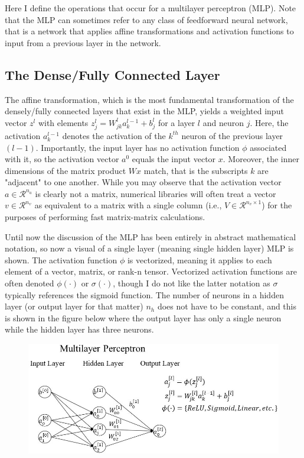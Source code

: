 \documentclass{article}
\begin{document}
\quad Here I define the operations that occur for a multilayer perceptron (MLP).
Note that the MLP can sometimes refer to any class of feedforward
neural network, that is a network that applies affine transformations and
activation functions to input from a previous layer in the network.

\subsection{The Dense/Fully Connected Layer}

The affine transformation, which is the most fundamental transformation
of the densely/fully connected layers that exist in the MLP, yields
a weighted input vector $z^{l}$ with elements
$z_j^{l} = W_{jk}^{l} a_{k}^{l-1} + b_{j}^{l}$ for a layer $l$ and neuron $j$.
Here, the activation $a_k^{l-1}$ denotes the activation of the $k^{th}$ neuron of the
previous layer $(l-1)$. Importantly, the input layer has no activation function $\phi$
associated with it, so the activation vector $a^{0}$ equals the input vector $x$.
Moreover, the inner dimensions of the matrix product
$Wx$ match, that is the subscripts $k$ are "adjacent" to one another. While you may
observe that the activation vector $a \in \mathcal{R}^{n_a}$ is clearly not a matrix,
numerical libraries will often treat a vector $v \in \mathcal{R}^{n_v}$ as equivalent
to a matrix with a single column (i.e., $V \in \mathcal{R}^{n_v \times 1}$) for
the purposes of performing fast matrix-matrix calculations.

Until now the discussion of the MLP has been entirely in abstract mathematical
notation, so now a visual of a single layer (meaning single hidden layer)
MLP is shown. The activation function $\phi$ is vectorized, meaning it
applies to each element of a vector, matrix, or rank-n tensor. Vectorized
activation functions are often denoted $\phi(\cdot)$ or $\sigma(\cdot)$, though I do not like
the latter notation as $\sigma$ typically references the sigmoid function. The number of
neurons in a hidden layer (or output layer for that matter) $n_h$ does not have
to be constant, and this is shown in the figure below where the output layer
has only a single neuron while the hidden layer has three neurons.

\begin{figure}[h]
	\includegraphics[scale=0.60]{mlp_larger_font_croppped.jpg}
\end{figure}
\end{document}
